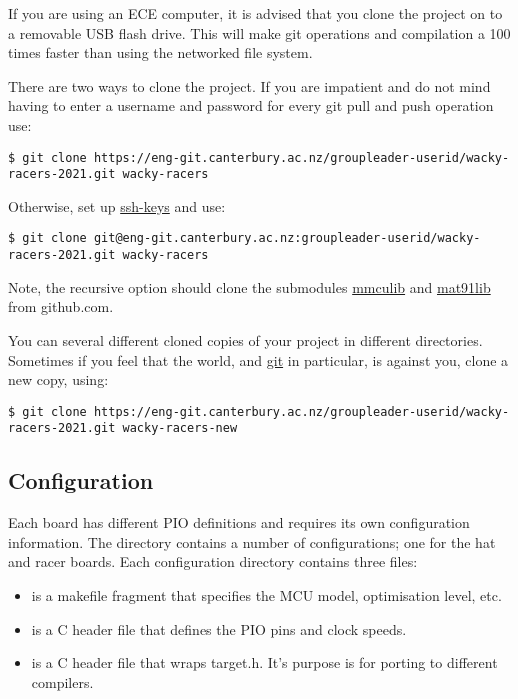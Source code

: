 If you are using an ECE computer, it is advised that you clone the
project on to a removable USB flash drive. This will make git operations
and compilation a 100 times faster than using the networked file system.

There are two ways to clone the project. If you are impatient and do not
mind having to enter a username and password for every git pull and push
operation use:
%
\begin{verbatim}
$ git clone https://eng-git.canterbury.ac.nz/groupleader-userid/wacky-racers-2021.git wacky-racers
\end{verbatim}

Otherwise, set up \url{ssh-keys} and use:
%
\begin{verbatim}
$ git clone git@eng-git.canterbury.ac.nz:groupleader-userid/wacky-racers-2021.git wacky-racers
\end{verbatim}

Note, the recursive option should clone the submodules \url{mmculib} and
\url{mat91lib} from github.com.

You can several different cloned copies of your project in different
directories. Sometimes if you feel that the world, and \url{git} in
particular, is against you, clone a new copy, using:


\begin{verbatim}
$ git clone https://eng-git.canterbury.ac.nz/groupleader-userid/wacky-racers-2021.git wacky-racers-new
\end{verbatim}

\subsection{Configuration}
\label{configuration}

Each board has different PIO definitions and requires its own
configuration information. The 
directory contains a number of configurations; one for the hat and racer
boards. Each configuration directory contains three files:

\begin{itemize}
\item
   is a makefile fragment that specifies the MCU model,
  optimisation level, etc.
\item
   is a C header file that defines the PIO pins and
  clock speeds.
\item
   is a C header file that wraps target.h. It's purpose
  is for porting to different compilers.
\end{itemize}

